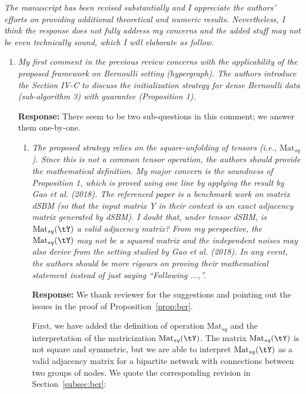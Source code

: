 \documentclass[11pt]{article}
\theoremstyle{definition}
\theoremstyle{definition}
\newcommand{\Mat}{\text{Mat}}
\begin{document}
\textit{The manuscript has been revised substantially and I appreciate the authors’ efforts on providing additional theoretical and numeric results. Nevertheless, I think the response does not fully address my concerns and the added stuff may not be even technically sound, which I will elaborate as follow.}

\begin{enumerate}
    \item \textit{My first comment in the previous review concerns with the applicability of the proposed framework on Bernoulli setting (hypergraph). The authors introduce the Section IV-C to discuss the initialization strategy for dense Bernoulli data (sub-algorithm 3) with guarantee (Proposition 1).}

    \textbf{Response:} There seem to be two sub-questions in this comment; we answer them one-by-one. 

    \begin{enumerate}[wide]
        \item \textit{The proposed strategy relies on the square-unfolding of tensors (i.e., $\Mat_{sq}$). Since this is not a common tensor operation, the authors should provide the mathematical definition. My major concern is the soundness of Proposition 1, which is proved using one line by applying the result by Gao et al. (2018). The referenced paper is a benchmark work on matrix dSBM (so that the input matrix Y in their context is an exact adjacency matrix generated by dSBM). I doubt that, under tensor dSBM, is $\Mat_{sq}(\tY)$ a valid adjacency matrix? From my perspective, the $\Mat_{sq}(\tY)$ may not be a squared matrix and the independent noises may also derive from the setting studied by Gao et al. (2018). In any event, the authors should be more rigours on proving their mathematical statement instead of just saying “Following ...,”.}

        \textbf{Response:} We thank reviewer for the suggestions and pointing out the issues in the proof of Proposition~\ref{prop:ber}. 
        
        First, we have added the definition of operation $\Mat_{sq}$ and the interpretation of the matricization $\Mat_{sq}(\tY)$. The matrix  $\Mat_{sq}(\tY)$ is not square and symmetric, but we are able to interpret $\Mat_{sq}(\tY)$ as a valid adjacency matrix for a bipartite network with connections between two groups of nodes. We quote the corresponding revision in Section~\ref{subsec:ber}:
        

\end{enumerate}
\end{enumerate}
\end{document}
